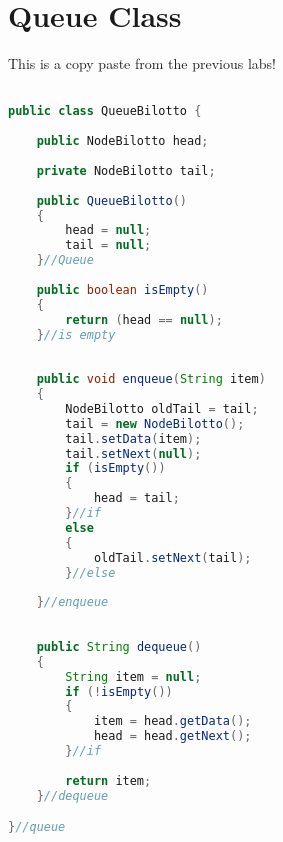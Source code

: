 \documentclass[letterpaper, 10pt]{article}
\begin{document}
\section{Queue Class}
This is a copy paste from the previous labs!
\begin{lstlisting}[language = java]

public class QueueBilotto {
	
	public NodeBilotto head;
	
	private NodeBilotto tail;
	
	public QueueBilotto()
	{
		head = null;
		tail = null;
	}//Queue
	
	public boolean isEmpty()
	{
		return (head == null);
	}//is empty
	
	
	public void enqueue(String item)
	{
		NodeBilotto oldTail = tail;
		tail = new NodeBilotto();
		tail.setData(item);
		tail.setNext(null);
		if (isEmpty())
		{
			head = tail;
		}//if
		else
		{
			oldTail.setNext(tail);
		}//else
		
	}//enqueue
	
	
	public String dequeue()
	{
		String item = null;
		if (!isEmpty())
		{
			item = head.getData();
			head = head.getNext();
		}//if
		
		return item;
	}//dequeue

}//queue


\end{lstlisting}
\end{document}
